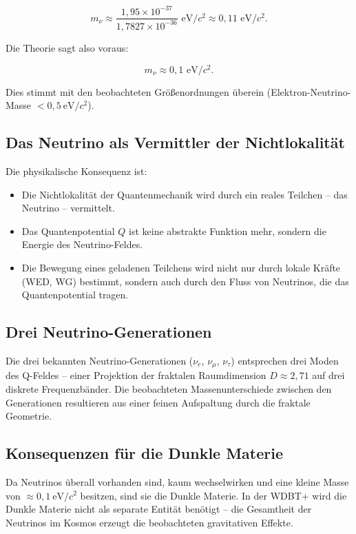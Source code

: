 \documentclass[12pt,a4paper]{article}
\begin{document}
\begin{equation}
m_\nu \approx \frac{1,95 \times 10^{-37}}{1,7827 \times 10^{-36}} \text{ eV}/c^2 \approx 0,11 \text{ eV}/c^2.
\end{equation}

Die Theorie sagt also voraus:

\begin{equation}
m_\nu \approx 0,1 \text{ eV}/c^2.
\end{equation}

Dies stimmt mit den beobachteten Größenordnungen überein (Elektron-Neutrino-Masse $< 0,5\ \text{eV}/c^2$).

\subsection{Das Neutrino als Vermittler der Nichtlokalität}

Die physikalische Konsequenz ist:
\begin{itemize}
\item Die Nichtlokalität der Quantenmechanik wird durch ein reales Teilchen -- das Neutrino -- vermittelt.
\item Das Quantenpotential $Q$ ist keine abstrakte Funktion mehr, sondern die Energie des Neutrino-Feldes.
\item Die Bewegung eines geladenen Teilchens wird nicht nur durch lokale Kräfte (WED, WG) bestimmt, sondern auch durch den Fluss von Neutrinos, die das Quantenpotential tragen.
\end{itemize}

\subsection{Drei Neutrino-Generationen}

Die drei bekannten Neutrino-Generationen ($\nu_e$, $\nu_\mu$, $\nu_\tau$) entsprechen drei Moden des Q-Feldes -- einer Projektion der fraktalen Raumdimension $D \approx 2,71$ auf drei diskrete Frequenzbänder. Die beobachteten Massenunterschiede zwischen den Generationen resultieren aus einer feinen Aufspaltung durch die fraktale Geometrie.

\subsection{Konsequenzen für die Dunkle Materie}

Da Neutrinos überall vorhanden sind, kaum wechselwirken und eine kleine Masse von $\approx 0,1\ \text{eV}/c^2$ besitzen, sind sie die Dunkle Materie. In der WDBT+ wird die Dunkle Materie nicht als separate Entität benötigt -- die Gesamtheit der Neutrinos im Kosmos erzeugt die beobachteten gravitativen Effekte.
\end{document}
